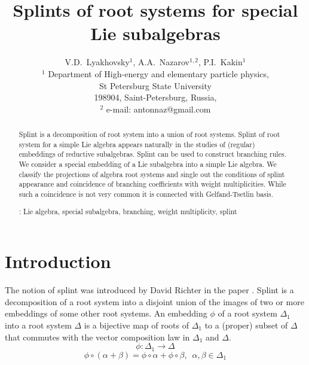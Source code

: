 \documentclass[12pt]{article}
\begin{document}
\title{Splints of root systems for special Lie subalgebras}

\author{V.D.~Lyakhovsky$^1$, A.A.~Nazarov$^{1,2}$, P.I.~Kakin$^{1}$\\
  {\small $^1$ Department of High-energy and elementary particle physics,}\\ {\small St Petersburg State University}\\
  {\small 198904, Saint-Petersburg, Russia,}\\
  {\small $^{2}$ e-mail: antonnaz@gmail.com}}

\maketitle

\begin{abstract}
  Splint is a decomposition of root system into a union of root systems. Splint of root system for a
  simple Lie algebra appears naturally in the studies of (regular) embeddings of reductive
  subalgebras. Splint can be used to construct branching rules. We consider a special embedding of a
  Lie subalgebra into a simple Lie algebra. We classify the projections of algebra root systems and
  single out the conditions of splint appearance and coincidence of branching coefficients with
  weight multiplicities. While such a coincidence is not very common it is connected with
  Gelfand-Tsetlin basis.

: Lie algebra, special subalgebra, branching, weight multiplicity, splint
\end{abstract}


\section{Introduction}
\label{sec:introduction}

The notion of splint was introduced by David Richter in the paper \cite{richter2008splints}. Splint
is a decomposition of a root system into a disjoint union of the images of two or more embeddings of some
other root systems. An embedding $\phi$ of a root system $\Delta_1$ into a root system $\Delta$ is a
bijective map of roots of $\Delta_{1}$ to a (proper) subset of $\Delta$ that commutes with the vector
composition law in $\Delta_{1}$ and $\Delta$.
\begin{equation*}
\phi:\Delta_1 \longrightarrow \Delta
\end{equation*}
\begin{equation*}
\phi \circ (\alpha + \beta) =\phi \circ \alpha + \phi \circ \beta,
\,\,\, \alpha,\beta \in \Delta_1
\end{equation*}
\end{document}
